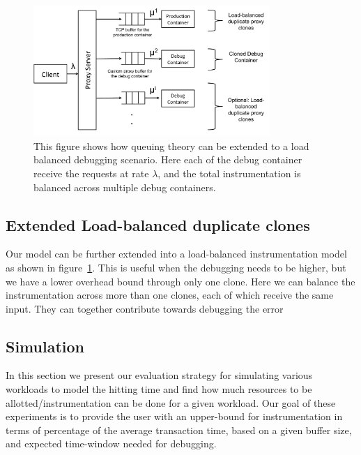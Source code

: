 \begin{figure}[ht!]
	\begin{center}
		\includegraphics[width=0.8\textwidth]{queue/figs/queueBalanced.pdf}
		\caption{This figure shows how queuing theory can be extended to a load balanced debugging scenario. Here each of the debug container receive the requests at rate $\lambda$, and the total instrumentation is balanced across multiple debug containers.}
		\label{fig:queueBalanced}
	\end{center}
\end{figure}

\subsection{Extended Load-balanced duplicate clones}

Our model can be further extended into a load-balanced instrumentation model as shown in figure~\ref{fig:queueBalanced}. 
This is useful when the debugging needs to be higher, but we have a lower overhead bound through only one clone.
Here we can balance the instrumentation across more than one clones, each of which receive the same input.
They can together contribute towards debugging the error

\subsection{Simulation}
\label{sec:queueEval}

In this section we present our evaluation strategy for simulating various workloads to model the hitting time and find how much resources to be allotted/instrumentation can be done for a given workload. 
Our goal of these experiments is to provide the user with an upper-bound for instrumentation in terms of percentage of the average transaction time, based on a given buffer size, and expected time-window needed for debugging.

